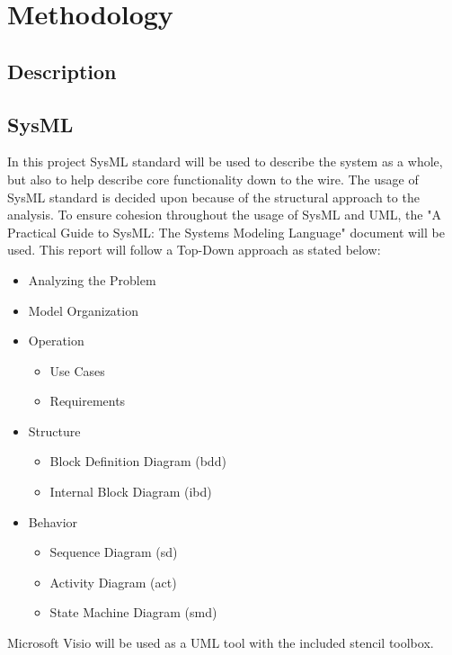 \section{Methodology}
\subsection{Description}
\noindent{}


\subsection{SysML}
In this project SysML standard will be used to describe the system as a whole, but also to help describe core functionality down to the wire. The usage of SysML standard is decided upon because of the structural approach to the analysis. To ensure cohesion throughout the usage of SysML and UML, the "A Practical Guide to SysML: The Systems Modeling Language"\cite{Friedenthal2014} document will be used. This report will follow a Top-Down approach as stated below:

\begin{itemize}
	\item Analyzing the Problem
	\item Model Organization
	\item Operation
	\begin{itemize}
		\item Use Cases
		\item Requirements
	\end{itemize}
	\item Structure
	\begin{itemize}
		\item Block Definition Diagram (bdd)
		\item Internal Block Diagram (ibd)
	\end{itemize}
	\item Behavior
	\begin{itemize}
		\item Sequence Diagram (sd)
		\item Activity Diagram (act)
		\item State Machine Diagram (smd)
	\end{itemize}
\end{itemize}


Microsoft Visio will be used as a UML tool with the included stencil toolbox.












